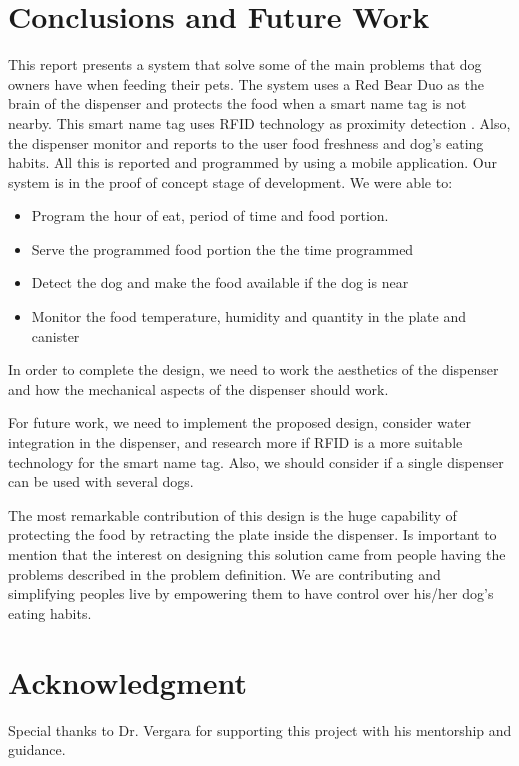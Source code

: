 \documentclass[12pt]{article}
\begin{document}
\section{Conclusions and Future Work}

This report presents a system that solve some of the main problems that dog owners have when feeding their pets. The system uses a Red Bear Duo as the brain of the dispenser and protects the food when a smart name tag is not nearby. This smart name tag uses RFID technology as proximity detection . Also, the dispenser monitor and reports to the user food freshness and dog's eating habits. All this is reported and programmed by using a mobile application. Our system is in the proof of concept stage of development. We were able to:

\begin{itemize}
  \item Program the hour of eat, period of time and food portion.
  \item Serve the programmed food portion the the time programmed
  \item Detect the dog and make the food available if the dog is near
  \item Monitor the food temperature, humidity and quantity in the plate and canister
\end{itemize}

In order to complete the design, we need to work the aesthetics of the dispenser and how the mechanical aspects of the dispenser should work.

For future work, we need to implement the proposed design, consider water integration in the dispenser, and research more if RFID is a more suitable technology for the smart name tag. Also, we should consider if a single dispenser can be used with several dogs.

The most remarkable contribution of this design is the huge capability of protecting the food by retracting the plate inside the dispenser. Is important to mention that the interest on designing this solution came from people having the problems described in the problem definition. We are contributing and simplifying peoples live by empowering them to have control over his/her dog's eating habits.


\section*{Acknowledgment}

Special thanks to Dr. Vergara for supporting this project with his mentorship and guidance.
\end{document}
